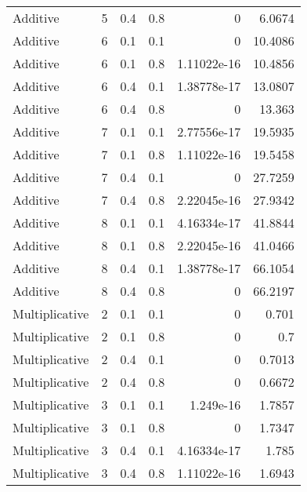 \documentclass{article}
\begin{document}
\begin{figure}[H]
\begin{tabular}{lrrrrr}
 Additive       &       5 &   0.4 &            0.8 & 0           &            6.0674 \\
 Additive       &       6 &   0.1 &            0.1 & 0           &           10.4086 \\
 Additive       &       6 &   0.1 &            0.8 & 1.11022e-16 &           10.4856 \\
 Additive       &       6 &   0.4 &            0.1 & 1.38778e-17 &           13.0807 \\
 Additive       &       6 &   0.4 &            0.8 & 0           &           13.363  \\
 Additive       &       7 &   0.1 &            0.1 & 2.77556e-17 &           19.5935 \\
 Additive       &       7 &   0.1 &            0.8 & 1.11022e-16 &           19.5458 \\
 Additive       &       7 &   0.4 &            0.1 & 0           &           27.7259 \\
 Additive       &       7 &   0.4 &            0.8 & 2.22045e-16 &           27.9342 \\
 Additive       &       8 &   0.1 &            0.1 & 4.16334e-17 &           41.8844 \\
 Additive       &       8 &   0.1 &            0.8 & 2.22045e-16 &           41.0466 \\
 Additive       &       8 &   0.4 &            0.1 & 1.38778e-17 &           66.1054 \\
 Additive       &       8 &   0.4 &            0.8 & 0           &           66.2197 \\
 Multiplicative &       2 &   0.1 &            0.1 & 0           &            0.701  \\
 Multiplicative &       2 &   0.1 &            0.8 & 0           &            0.7    \\
 Multiplicative &       2 &   0.4 &            0.1 & 0           &            0.7013 \\
 Multiplicative &       2 &   0.4 &            0.8 & 0           &            0.6672 \\
 Multiplicative &       3 &   0.1 &            0.1 & 1.249e-16   &            1.7857 \\
 Multiplicative &       3 &   0.1 &            0.8 & 0           &            1.7347 \\
 Multiplicative &       3 &   0.4 &            0.1 & 4.16334e-17 &            1.785  \\
 Multiplicative &       3 &   0.4 &            0.8 & 1.11022e-16 &            1.6943 \\

\end{tabular}
\end{figure}
\end{document}
